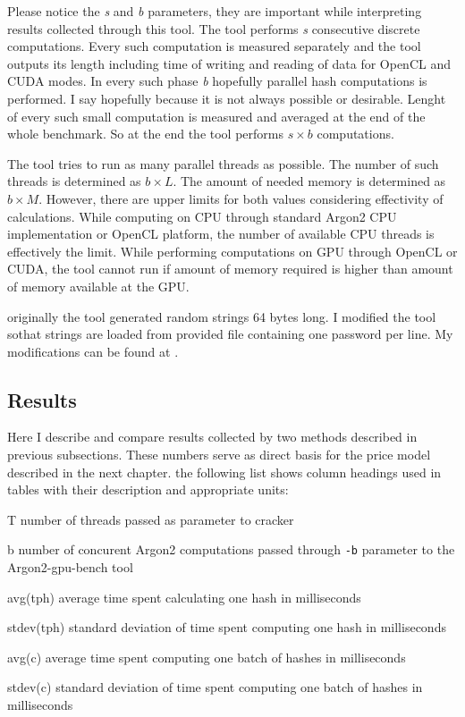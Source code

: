 \documentclass[nolof]{fithesis3}
\begin{document}
Please notice the \emph{s} and \emph{b} parameters, they are important while interpreting results collected through this tool. The tool performs \emph{s} consecutive discrete computations. Every such computation is measured separately and the tool outputs its length including time of writing and reading of data for OpenCL and CUDA modes. In every such phase \emph{b} hopefully parallel hash computations is performed. I say hopefully because it is not always possible or desirable. Lenght of every such small computation is measured and averaged at the end of the whole benchmark.  So at the end the tool performs $s \times b$ computations.

The tool tries to run as many parallel threads as possible. The number of such threads is determined as $b \times L$. The amount of needed memory is determined as $b \times M$. However, there are upper limits for both values considering effectivity of calculations. While computing on CPU through standard Argon2 CPU implementation or OpenCL platform, the number of available CPU threads is effectively the limit. While performing computations on GPU through OpenCL or CUDA, the tool cannot run if amount of memory required is higher than amount of memory available at the GPU.

originally the tool generated random strings 64 bytes long. I modified the tool sothat strings are loaded from provided file containing one password per line. My modifications can be found at \parencite{argon2gpuvojta}.

\FloatBarrier

\subsection{Results}
Here I describe and compare results collected by two methods described in previous subsections. These numbers serve as direct basis for the price model described in the next chapter. the following list shows column headings used in tables with their description and appropriate units:

\begin{description}
\item{T} number of threads passed as parameter to cracker

\item{b} number of concurent Argon2 computations passed through \verb+-b+ parameter to the Argon2-gpu-bench tool

\item{avg(tph)} average time spent calculating one hash in milliseconds

\item{stdev(tph)} standard deviation of time spent computing one hash in milliseconds

\item{avg(c)} average time spent computing one batch of hashes in milliseconds

\item{stdev(c)} standard deviation of time spent computing one batch of hashes in milliseconds
\end{description}
\end{document}

